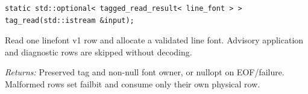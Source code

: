 \par\noindent\begin{minipage}{\linewidth}
\begin{lstlisting}[style=apireference]
static std::optional< tagged_read_result< line_font > > tag_read(std::istream &input);
\end{lstlisting}
{\footnotesize Read one linefont v1 row and allocate a validated line font. Advisory application and diagnostic rows are skipped without decoding.\par}
{\footnotesize\textit{Returns:} Preserved tag and non-null font owner, or nullopt on EOF/failure. Malformed rows set failbit and consume only their own physical row.\par}
\end{minipage}\par\vspace{1pt}
